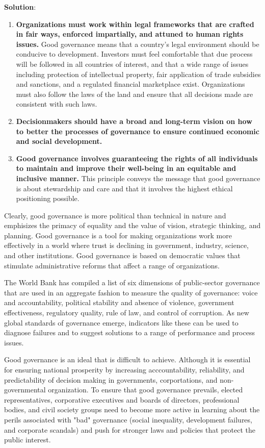 \documentclass[
  openany]{book}
\newenvironment{solution}{ {\bfseries Solution}:}{}
\begin{document}
\begin{questions}
\begin{solution}
\begin{enumerate}
\item \textbf{Organizations must work within legal frameworks that are crafted in fair ways, enforced impartially, and attuned to human rights issues.} Good governance means that a country’s legal environment should be conducive to development. Investors must feel comfortable that due process will be followed in all countries of interest, and that a wide range of issues including protection of intellectual property, fair application of trade subsidies and sanctions, and a regulated financial marketplace exist. Organizations must also follow the laws of the land and ensure that all decisions made are consistent with such laws.
\item \textbf{Decisionmakers should have a broad and long-term vision on how to better the processes of governance to ensure continued economic and social development.}
\item \textbf{Good governance involves guaranteeing the rights of all individuals to maintain and improve their well-being in an equitable and inclusive manner.} This principle conveys the message that good governance is about stewardship and care and that it involves the highest ethical positioning possible.
\end{enumerate}

Clearly, good governance is more political than technical in nature and emphisizes the primacy of equality and the value of vision, strategic thinking, and planning. Good governance is a tool for making organizations work more effectively in a world where trust is declining in government, industry, science, and other institutions. Good governance is based on democratic values that stimulate administrative reforms that affect a range of organizations.

The World Bank has compiled a list of six dimensions of public-sector governance that are used in an aggregate fashion to measure the quality of governance: voice and accountability, political stability and absence of violence, government effectiveness, regulatory quality, rule of law, and control of corruption. As new global standards of governance emerge, indicators like these can be used to diagnose failures and to suggest solutions to a range of performance and process issues.

Good governance is an ideal that is difficult to achieve. Although it is essential for ensuring national prosperity by increasing acccountability, reliability, and predictability of decision making in governments, corportations, and non-governmental organization. To ensure that good governance prevails, elected representatives, corporative executives and boards of directors, professional bodies, and civil society groups need to become more active in learning about the perils associated with "bad" governance (social inequality, development failures, and corporate scandals) and push for stronger laws and policies that protect the public interest.


\end{solution}
\end{questions}
\end{document}
